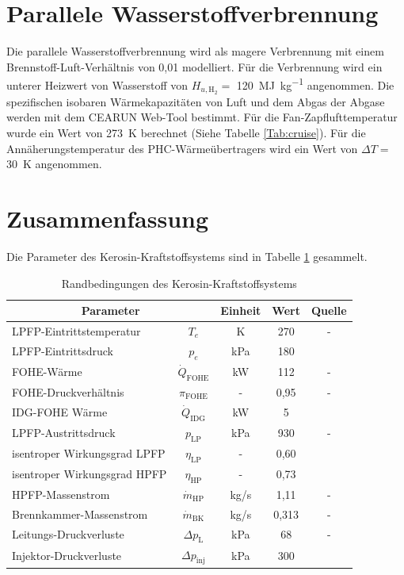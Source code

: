 \section{Parallele Wasserstoffverbrennung}

Die parallele Wasserstoffverbrennung wird als magere Verbrennung mit einem Brennstoff-Luft-Verhältnis von 0,01 modelliert. Für die Verbrennung wird ein unterer Heizwert von Wasserstoff von $H_{u, \mathrm{H}_2}= $ \SI{120}{\mega\J\per\kg} angenommen. Die spezifischen isobaren Wärmekapazitäten von Luft und dem Abgas der Abgase werden mit dem CEARUN Web-Tool \cite{Leader.} bestimmt. Für die Fan-Zapflufttemperatur wurde ein Wert von \SI{273}{\K} berechnet (Siehe Tabelle \ref{Tab:cruise}). Für die Annäherungstemperatur des PHC-Wärmeübertragers wird ein Wert von $\Delta T= $ \SI{30}{\K} angenommen. %

\section{Zusammenfassung}

Die Parameter des Kerosin-Kraftstoffsystems sind in Tabelle \ref{Tab:referenz_parametrisiert} gesammelt.

\begin{table}[ht]
    \centering
	\caption{Randbedingungen des Kerosin-Kraftstoffsystems}
	\begin{tabular} {|l|c|c|c|c|} \hline%
		\multicolumn{2}{|c|}{Parameter} & Einheit & Wert & Quelle\\ \hline\hline%
        LPFP-Eintrittstemperatur & $T_e$ & K & 270 & - \\ \hline
        LPFP-Eintrittsdruck & $p_e$ & kPa & 180 & \cite{EatonFuelSystemsDivision.2013} \\ \hline
        FOHE-Wärme & $\dot{Q}_{\mathrm{FOHE}}$ & kW & 112 & - \\ \hline
        FOHE-Druckverhältnis & $\pi_{\mathrm{FOHE}}$ & - & 0,95 & - \\ \hline
        IDG-FOHE Wärme  & $\dot{Q}_\mathrm{IDG}$ & kW & 5 & \cite{Sciatti.2024} \\ \hline
        LPFP-Austrittsdruck & $p_\mathrm{LP}$ & kPa & 930 & - \\ \hline
        isentroper Wirkungsgrad LPFP & $\eta_\mathrm{LP}$ & - & 0,60 & \cite{Zhou.2023} \\ \hline
        isentroper Wirkungsgrad HPFP & $\eta_\mathrm{HP}$ & - & 0,73 & \cite{Xu.2024} \\ \hline
        HPFP-Massenstrom & $\dot{m}_\mathrm{HP}$ & kg/s & 1,11 & - \\ \hline
        Brennkammer-Massenstrom & $\dot{m}_\mathrm{BK}$ & kg/s & 0,313 & - \\ \hline
        Leitungs-Druckverluste & $\Delta p_\mathrm{L}$ & kPa & 68 & - \\ \hline
        Injektor-Druckverluste & $\Delta p_\mathrm{inj}$ & kPa & 300 & \cite{Mazaheri.2012} \\ \hline
	\end{tabular}	
    \label{Tab:referenz_parametrisiert}%
\end{table}
\FloatBarrier 

